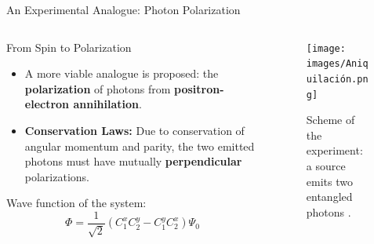 \begin{frame}{An Experimental Analogue: Photon Polarization}

  \begin{columns}[T]
    \begin{column}{0.6\textwidth}
      \begin{block}{From Spin to Polarization}
        \begin{itemize}[<+->]
          \item A more viable analogue is proposed: the \textbf{polarization} of photons from \textbf{positron-electron annihilation}.
          \item \textbf{Conservation Laws:} Due to conservation of angular momentum and parity, the two emitted photons must have mutually \textbf{perpendicular} polarizations.
        \end{itemize}
      \end{block}
      \vspace{0.5em}
      Wave function of the system:
      $$ {\Phi} = \frac{1}{\sqrt{2}} \left( C_1^x C_2^y - C_1^y C_2^x \right) \Psi_0 $$
    \end{column}

    \begin{column}{0.4\textwidth}
      \begin{figure}
        \centering
        \texttt{[image: images/Aniquilación.png]}
        \caption{Scheme of the experiment: a source emits two entangled photons \cite{Google2025_PhotonScheme}.}
      \end{figure}
    \end{column}
  \end{columns}

\end{frame}

